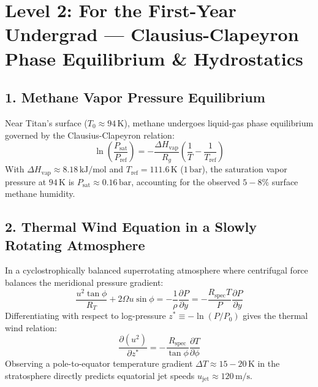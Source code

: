 \documentclass[11pt,a4paper]{article}
\begin{document}
\section*{Level 2: For the First-Year Undergrad — Clausius-Clapeyron Phase Equilibrium \& Hydrostatics}

\subsection*{1. Methane Vapor Pressure Equilibrium}
Near Titan's surface ($T_0 \approx 94\,\text{K}$), methane undergoes liquid-gas phase equilibrium governed by the Clausius-Clapeyron relation:
\begin{equation}
\ln\left(\frac{P_{\text{sat}}}{P_{\text{ref}}}\right) = -\frac{\Delta H_{\text{vap}}}{R_g} \left( \frac{1}{T} - \frac{1}{T_{\text{ref}}} \right)
\end{equation}
With $\Delta H_{\text{vap}} \approx 8.18\,\text{kJ/mol}$ and $T_{\text{ref}} = 111.6\,\text{K}$ ($1\,\text{bar}$), the saturation vapor pressure at $94\,\text{K}$ is $P_{\text{sat}} \approx 0.16\,\text{bar}$, accounting for the observed $5 - 8\%$ surface methane humidity.

\subsection*{2. Thermal Wind Equation in a Slowly Rotating Atmosphere}
In a cyclostrophically balanced superrotating atmosphere where centrifugal force balances the meridional pressure gradient:
\begin{equation}
\frac{u^2 \tan\phi}{R_T} + 2 \Omega u \sin\phi = -\frac{1}{\rho} \frac{\partial P}{\partial y} = -\frac{R_{\text{spec}} T}{P} \frac{\partial P}{\partial y}
\end{equation}
Differentiating with respect to log-pressure $z^* \equiv -\ln(P/P_0)$ gives the thermal wind relation:
\begin{equation}
\frac{\partial (u^2)}{\partial z^*} = -\frac{R_{\text{spec}}}{\tan\phi} \frac{\partial T}{\partial \phi}
\end{equation}
Observing a pole-to-equator temperature gradient $\Delta T \approx 15 - 20\,\text{K}$ in the stratosphere directly predicts equatorial jet speeds $u_{\text{jet}} \approx 120\,\text{m/s}$.

\newpage

\end{document}
